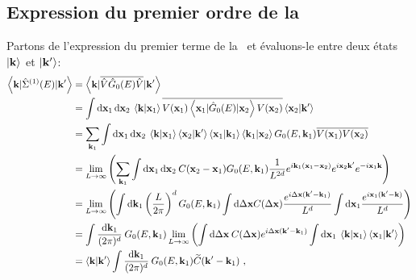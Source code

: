 \subsection{Expression du premier ordre de la \selfenergy}
Partons de l'expression du premier terme de la \selfenergy\ et évaluons-le entre deux états $\left| \mathbf{k} \right\rangle$ et $\left| \mathbf{k}' \right\rangle$:
\begin{align}
\left\langle \mathbf{k} | \hat{\Sigma}^{(1)}(E) | \mathbf{k}' \right\rangle &= \left\langle \mathbf{k} | \overline{\hat{V} \hat{G}_0(E) \hat{V}} | \mathbf{k}' \right\rangle \\
&= \int{ \mathop{}\mathopen{}\mathrm{d}\mathbf{x}_{\mathrm{1}} \mathop{}\mathopen{}\mathrm{d}\mathbf{x}_{\mathrm{2}} \: \left\langle \mathbf{k} | \mathbf{x}_{\mathrm{1}} \right\rangle \overline{V(\mathbf{x}_{\mathrm{1}}) \left\langle \mathbf{x}_{\mathrm{1}} | \hat{G}_0(E) | \mathbf{x}_{\mathrm{2}}\right\rangle V(\mathbf{x}_{\mathrm{2}}) } \left\langle \mathbf{x}_{\mathrm{2}} |\mathbf{k}' \right\rangle} \\
&= \sum_{\mathbf{k}_{\mathrm{1}}}{\int{\mathop{}\mathopen{}\mathrm{d}\mathbf{x}_{\mathrm{1}} \mathop{}\mathopen{}\mathrm{d}\mathbf{x}_{\mathrm{2}} \: \left\langle \mathbf{k} |\mathbf{x}_{\mathrm{1}} \right\rangle \left\langle \mathbf{x}_{\mathrm{2}} | \mathbf{k}' \right\rangle \left\langle \mathbf{x}_{\mathrm{1}} | \mathbf{k}_{\mathrm{1}} \right\rangle \left\langle \mathbf{k}_{\mathrm{1}} | \mathbf{x}_{\mathrm{2}} \right\rangle G_0(E,\mathbf{k}_{\mathrm{1}})\overline{V(\mathbf{x}_{\mathrm{1}})V(\mathbf{x}_{\mathrm{2}})}}} \\
&= \lim\limits_{L\rightarrow\infty} \left( \sum_{\mathbf{k}_{\mathrm{1}}}{\int{\mathop{}\mathopen{}\mathrm{d}\mathbf{x}_{\mathrm{1}}\mathop{}\mathopen{}\mathrm{d}\mathbf{x}_{\mathrm{2}}\: C(\mathbf{x}_{\mathrm{2}}-\mathbf{x}_{\mathrm{1}}) G_0(E,\mathbf{k}_{\mathrm{1}}) \frac{1}{L^{2d}} e^{i \mathbf{k}_{\mathrm{1}}(\mathbf{x}_{\mathrm{1}}-\mathbf{x}_{\mathrm{2}})} e^{i \mathbf{x}_{\mathrm{2}} \mathbf{k}'} e^{-i \mathbf{x}_{\mathrm{1}} \mathbf{k}} }} \right) \\
&= \lim\limits_{L\rightarrow\infty} \left( \int{\mathop{}\mathopen{}\mathrm{d}\mathbf{k}_{\mathrm{1}}  \left(\frac{L}{2\pi}\right)^d G_0(E,\mathbf{k}_{\mathrm{1}}) \int{\mathop{}\mathopen{}\mathrm{d}\Delta\mathbf{x}  C(\Delta\mathbf{x}) \frac{e^{i \Delta\mathbf{x}(\mathbf{k}'-\mathbf{k}_{\mathrm{1}})}}{L^d}} \int{\mathop{}\mathopen{}\mathrm{d}\mathbf{x}_{\mathrm{1}} \frac{e^{i \mathbf{x}_{\mathrm{1}}(\mathbf{k}'-\mathbf{k})}}{L^d}} } \right) \\
&=\int{\frac{\mathop{}\mathopen{}\mathrm{d}\mathbf{k}_{\mathrm{1}}}{(2\pi)^d} \: G_0(E,\mathbf{k}_{\mathrm{1}}) \lim\limits_{L\rightarrow\infty}\left( \int{\mathop{}\mathopen{}\mathrm{d}\Delta\mathbf{x} \: C(\Delta\mathbf{x}) e^{i\Delta\mathbf{x}(\mathbf{k}'-\mathbf{k}_{\mathrm{1}})}} \int{\mathop{}\mathopen{}\mathrm{d}\mathbf{x}_{\mathrm{1}} \: \left\langle \mathbf{k} | \mathbf{x}_{\mathrm{1}}\right\rangle \left\langle \mathbf{x}_{\mathrm{1}} | \mathbf{k}' \right\rangle } \right)} \\
&= \left\langle \mathbf{k} | \mathbf{k}' \right\rangle \int{\frac{\mathop{}\mathopen{}\mathrm{d}\mathbf{k}_{\mathrm{1}}}{(2\pi)^d} \: G_0(E,\mathbf{k}_{\mathrm{1}}) \widetilde{C}(\mathbf{k}'-\mathbf{k}_{\mathrm{1}})} \text{ ,}
\end{align}
